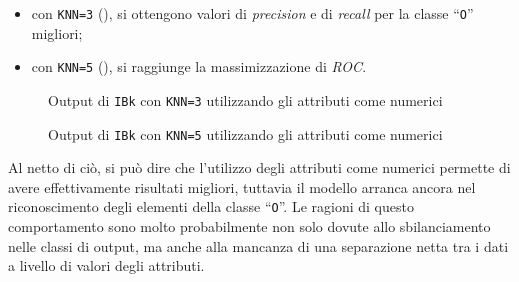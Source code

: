 \begin{itemize}
  \item con \texttt{KNN=3} (), si ottengono valori di \emph{precision} e di \emph{recall} per la classe ``\texttt{O}'' migliori;
  \item con \texttt{KNN=5} (), si raggiunge la massimizzazione di \emph{ROC}.
\end{itemize}


\begin{figure}[H]
  \centering
  \caption{Output di \texttt{IBk} con \texttt{KNN=3} utilizzando gli attributi come numerici}%
  \label{fig:ibk:3-num}
\end{figure}

\begin{figure}[H]
  \centering
  \caption{Output di \texttt{IBk} con \texttt{KNN=5} utilizzando gli attributi come numerici}%
  \label{fig:ibk:5-num}
\end{figure}

Al netto di ciò, si può dire che l'utilizzo degli attributi come numerici permette di avere effettivamente risultati migliori,
tuttavia il modello arranca ancora nel riconoscimento degli elementi della classe ``\texttt{O}''.
Le ragioni di questo comportamento sono molto probabilmente non solo dovute allo sbilanciamento nelle classi di output,
ma anche alla mancanza di una separazione netta tra i dati a livello di valori degli attributi.


